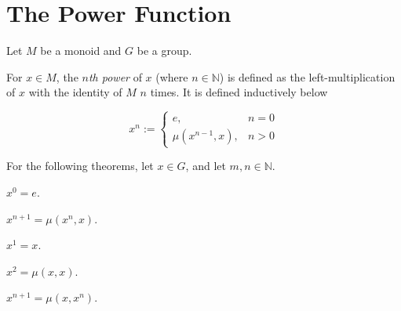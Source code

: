 \section{The Power Function}

Let $M$ be a monoid and $G$ be a group.

\begin{definition}
    \label{definition : mpow}
    \leanok
    For $x \in M$, the \textit{$n$th power} of $x$ (where $n \in \mathbb{N}$) is defined as the left-multiplication of $x$ with the identity of $M$ $n$ times. It is defined inductively below

    \begin{equation*}
        x^n := \begin{cases}
            e, & n = 0 \\
            \mu(x^{n-1}, x), & n > 0
        \end{cases}
    \end{equation*}
\end{definition}

For the following theorems, let $x \in G$, and let $m,n \in \mathbb{N}$.

\begin{theorem}
    \label{theorem : mpow_zero}
    \leanok
    $x^0 = e$.
\end{theorem}

\begin{theorem}
    \label{theorem : mpow_succ_right}
    \leanok
    $x^{n+1} = \mu(x^n,x)$.
\end{theorem}

\begin{theorem}
    \label{theorem : mpow_one}
    \leanok
    $x^1 = x$.
\end{theorem}

\begin{theorem}
    \label{theorem : mpow_two}
    \leanok
    $x^2 = \mu(x,x)$.
\end{theorem}

\begin{theorem}
    \label{theorem : mpow_succ_left}
    \leanok
    $x^{n+1} = \mu(x,x^n)$.
\end{theorem}

